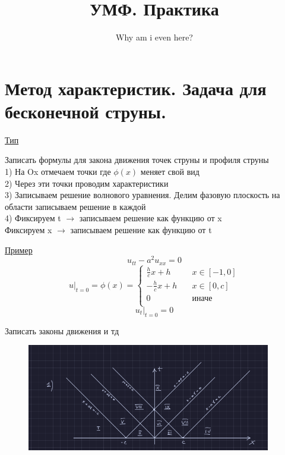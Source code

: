 \documentclass[a4paper]{article}
\begin{document}
\title{УМФ. Практика}
\author{Why am i even here?}
\maketitle
\section*{\centering Метод характеристик. Задача для бесконечной струны.}
\underline{Тип}\\
\begin{tcolorbox}
Записать формулы для закона движения точек струны и профиля струны\\
1) На Ox отмечаем точки где $ \phi(x) $ меняет свой вид\\
2) Через эти точки проводим характеристики\\
3) Записываем решение волнового уравнения. Делим фазовую плоскость на области 
записываем решение в каждой \\
4) Фиксируем t $ \rightarrow $  записываем решение как функцию от x\\
Фиксируем x $ \rightarrow $ записываем решение как функцию от t
\end{tcolorbox}

\begin{tcolorbox}
\underline{Пример}
\[
    u_{t t} - a^2 u_{xx}= 0
\]
\[
    u |_{t=0} = \phi(x) = 
    \begin{cases}
        \frac{h}{c} x + h &\quad x \in [-1, 0]\\
        -\frac{h}{c} x + h &\quad x \in [0, c]\\
        0 &\quad \text{иначе}\\
    \end{cases}
\]
\[
    u_t |_{t = 0} = 0
\]

Записать законы движения и тд
\end{tcolorbox}

\begin{figure}[!ht]
    \centering
    \includegraphics[width=0.95\textwidth]{mp-sem-pic1.png}
\end{figure}
\end{document}
